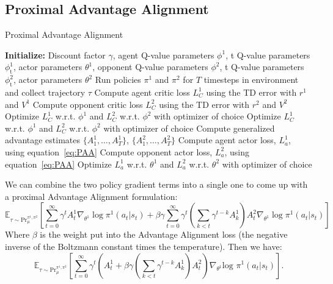\documentclass{article} \usepackage{iclr2025_conference,times}
\def\eqref#1{equation~\ref{#1}}
\begin{document}
\subsection{Proximal Advantage Alignment}
\label{app:PPA}
\begin{algorithm}[t]
\caption{Proximal Advantage Alignment}
\label{algo:PAA}
\begin{algorithmic}
\STATE \textbf{Initialize:} Discount factor $\gamma$, agent Q-value parameters $\phi^1$, t Q-value parameters $\phi_{\text{t}}^1$, actor parameters $\theta^1$, opponent Q-value parameters $\phi^2$, t Q-value parameters $\phi_{\text{t}}^2$, actor parameters $\theta^2$
    \STATE Run policies $\pi^1$ and $\pi^2$ for $T$ timesteps in environment and collect trajectory $\tau$
    \STATE Compute agent critic loss $L_C^1$ using the TD error with $r^1$ and $V^1$
    \STATE Compute opponent critic loss $L_C^2$ using the TD error with $r^2$ and $V^2$
    \STATE Optimize $L_C^1$ w.r.t. $\phi^1$ and $L_C^2$ w.r.t. $\phi^2$
    with optimizer of choice
    \STATE Optimize $L_C^1$ w.r.t. $\phi^1$ and $L_C^2$ w.r.t. $\phi^2$
    with optimizer of choice
    \STATE Compute generalized advantage estimates $\{A_1^1, \hdots, A_T^1\}$, $\{A_1^2, \hdots, A_T^2\}$
    \STATE Compute agent actor loss, $L_a^1$, using \eqref{eq:PAA} 
    \STATE Compute opponent actor loss, $L_a^2$, using \eqref{eq:PAA}
    \STATE Optimize $L_a^1$ w.r.t. $\theta^1$ and $L_a^2$ w.r.t. $\theta^2$
    with optimizer of choice
\ENDFOR
\end{algorithmic}
\end{algorithm}
We can combine the two policy gradient terms into a single one to come up with a proximal Advantage Alignment formulation:
\begin{equation}
    \label{eq:AA}
    \mathbb{E}_{\tau \sim \text{Pr}_{\mu}^{\pi^1, \pi^2}} \left[\sum_{t=0}^\infty \gamma^{t}A^1_t\nabla_{\theta^1}\log \pi^1(a_t|s_t) + \beta\gamma 
   \sum_{t=0}^\infty \gamma^t \left(\sum_{k<t} \gamma^{t-k}A^{1}_k\right)  A^2_t\nabla_{\theta^1}\log \pi^1(a_t|s_t) \right]
\end{equation}
Where $\beta$ is the weight put into the Advantage Alignment loss (the negative inverse of the Boltzmann constant times the temperature). Then we have:
\begin{equation}
    \label{eq:AA_sum}
    \mathbb{E}_{\tau \sim \text{Pr}_{\mu}^{\pi^1, \pi^2}} \left[\sum_{t=0}^\infty \gamma^t \left(A^1_t + \beta \gamma \left(\sum_{k<t} \gamma^{t-k} A^{1}_k \right)A^2_t\right)\nabla_{\theta^1}\text{log } \pi^1(a_t|s_t) \right].
\end{equation}
\end{document}
